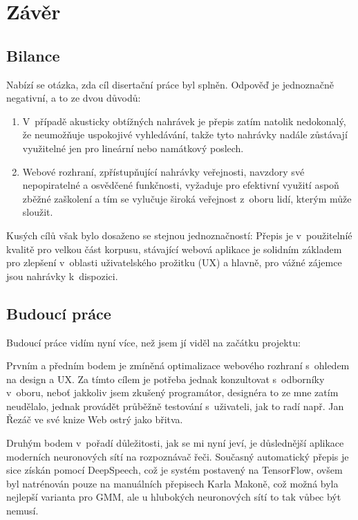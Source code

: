 \chapter{Závěr}
\label{kap:zaver}

\section{Bilance}

Nabízí se otázka, zda cíl disertační práce byl splněn. Odpověď je jednoznačně
negativní, a to ze dvou důvodů:
\begin{enumerate}
\item{V~případě akusticky obtížných nahrávek je přepis
zatím natolik nedokonalý, že neumožňuje uspokojivé vyhledávání, takže tyto
nahrávky nadále zůstávají využitelné jen pro lineární nebo namátkový poslech.}
\item{Webové rozhraní, zpřístupňující nahrávky veřejnosti, navzdory své
nepopiratelné a osvědčené funkčnosti, vyžaduje pro efektivní využití aspoň
zběžné zaškolení a tím se vylučuje široká veřejnost z~oboru lidí, kterým může
sloužit.}
\end{enumerate}

Kusých cílů však bylo dosaženo se stejnou jednoznačností: Přepis je
v~použitelníé kvalitě pro velkou část korpusu, stávající webová aplikace je
solidním základem pro zlepšení v~oblasti uživatelského prožitku (UX) a hlavně, pro
vážné zájemce jsou nahrávky k~dispozici.

\section{Budoucí práce}

Budoucí práce vidím nyní více, než jsem jí viděl na začátku projektu:

Prvním a předním bodem je zmíněná optimalizace webového rozhraní s~ohledem na
design a UX. Za tímto cílem je potřeba jednak konzultovat s~odborníky v~oboru,
neboť jakkoliv jsem zkušený programátor, designéra to ze mne zatím neudělalo, jednak provádět průběžně testování
s~uživateli, jak to radí např. Jan Řezáč ve své knize Web ostrý jako
břitva\cite{rezac2016web}.

Druhým bodem v~pořadí důležitosti, jak se mi nyní jeví, je důslednější aplikace
moderních neuronových sítí na rozpoznávač řeči. Současný automatický přepis je
sice získán pomocí DeepSpeech, což je systém postavený na TensorFlow, ovšem byl
natrénován pouze na manuálních
přepisech Karla Makoně, což možná byla nejlepší varianta pro GMM, ale u
hlubokých neuronových sítí to tak vůbec být nemusí.

